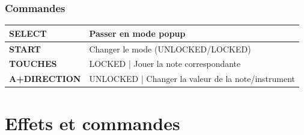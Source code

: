\documentclass[12pt,a4paper]{article}
\begin{document}
    
        \subsubsection{Commandes}
        
        \tablelasttail{\hline}
        \begin{supertabular}{|l|p{11cm}|}
        \hline
            {\bf SELECT} & Passer en mode popup \\
            \hline
            {\bf START} & Changer le mode (UNLOCKED/LOCKED) \\
            \hline
            {\bf TOUCHES} & LOCKED | Jouer la note correspondante \\
            \hline
            {\bf A+DIRECTION} & UNLOCKED | Changer la valeur de la note/instrument \\ 
        \hline
        \end{supertabular}
    
  \section{Effets et commandes}
  
	
\end{document}
